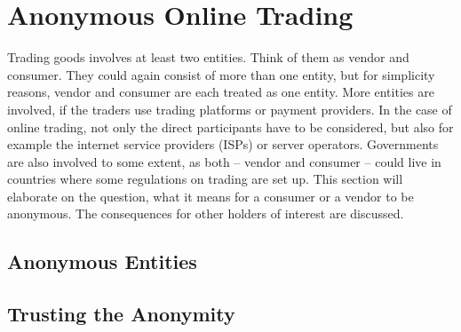 \section{Anonymous Online Trading}
\label{trading}

Trading goods involves at least two entities. Think of them as vendor and consumer. They could again consist of more than one entity, but for simplicity reasons, vendor and consumer are each treated as one entity. More entities are involved, if the traders use trading platforms or payment providers. In the case of online trading, not only the direct participants have to be considered, but also for example the internet service providers (ISPs) or server operators. Governments are also involved to some extent, as both -- vendor and consumer -- could live in countries where some regulations on trading are set up.
This section will elaborate on the question, what it means for a consumer or a vendor to be anonymous. The consequences for other holders of interest are discussed.

\subsection{Anonymous Entities}


\subsection{Trusting the Anonymity}



